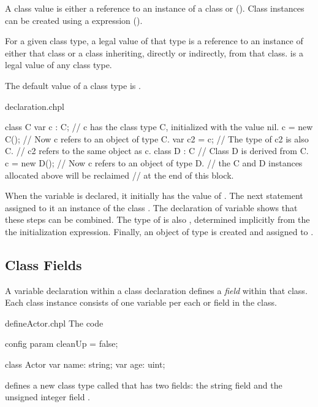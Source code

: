 A class value is either a reference to an instance of a class
or  (). Class instances can be created
using a  expression ().

For a given class type, a legal value of that type is a reference to
an instance of either that class or a class inheriting, directly or
indirectly, from that class.
 is a legal value of any class type.

The default value of a class type is .

\begin{chapelexample}{declaration.chpl}
\begin{chapel}
class C { }
var c : C;      // c has the class type C, initialized with the value nil.
c = new C();    // Now c refers to an object of type C.
var c2 = c;     // The type of c2 is also C.
                // c2 refers to the same object as c.
class D : C {}  // Class D is derived from C.
c = new D();    // Now c refers to an object of type D.
// the C and D instances allocated above will be reclaimed
// at the end of this block.
\end{chapel}
\begin{chapeloutput}
\end{chapeloutput}
When the variable  is declared, it initially has the value
of .  The next statement assigned to it an instance of the
class .  The declaration of variable  shows that these steps can
be combined.  The type of  is also , determined implicitly from
the the initialization expression.  Finally, an object of type  is created and
assigned to .
\end{chapelexample}

\subsection{Class Fields}
\label{Class_Fields}

A variable declaration within a class declaration defines
a \emph{field} within that class.
Each class instance consists of one variable per each
 or  field in the class.

\begin{chapelexample}{defineActor.chpl}
The code
\begin{chapelpre}
config param cleanUp = false;
\end{chapelpre}
\begin{chapel}
class Actor {
  var name: string;
  var age: uint;
}
\end{chapel}
\begin{chapeloutput}
\end{chapeloutput}
defines a new class type called  that has two fields: the
string field  and the unsigned integer field .
\end{chapelexample}

